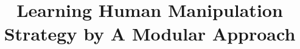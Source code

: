 

\documentclass[twocolumn]{svjour3}          %
%
\smartqed  %
%
\usepackage{amssymb}
\usepackage{caption}
\usepackage{slashbox}
\usepackage{graphics} %
\usepackage{epsfig} %
\usepackage{epstopdf}
\usepackage{subfig}
\usepackage{mathptmx} %
\usepackage{amsmath} %
\usepackage{amsmath}
\usepackage{array}
\usepackage{bm}
\usepackage{multirow}
\usepackage[usenames,dvipsnames,svgnames,table]{xcolor}
\usepackage{pbox}
\usepackage{hyperref}
\usepackage{algorithm}
\usepackage{algpseudocode}
\usepackage{natbib}


\sloppy

\title{Learning Human Manipulation Strategy by A Modular Approach}%



